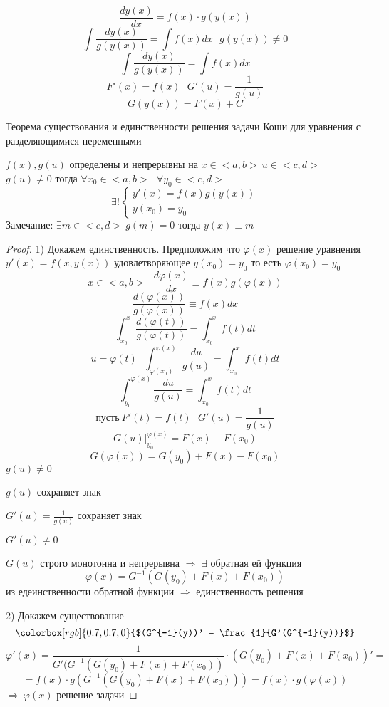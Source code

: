 \begin{block}
  $$
  \frac{dy(x)}{dx} = f(x) \cdot g(y(x))
  $$
  $$
  \int \frac{dy(x)}{g(y(x))} = \int f(x)dx ~~~ g(y(x)) \not= 0
  $$
  $$
  \int \frac{dy(x)}{g(y(x))} = \int f(x)dx
  $$
  $$
  F'(x) = f(x) ~~~ G'(u) = \frac{1}{g(u)}
  $$
  $$
  G(y(x)) = F(x) + C
  $$
\end{block}

\begin{title}[\Large]
  Теорема существования и единственности решения задачи Коши для уравнения с
  разделяющимися переменными
\end{title}

\begin{theorem}
  $f(x), g(u)$ определены и непрерывны на $x \in <a, b> ~ u \in <c, d>$
  $g(u) \not= 0$ тогда
  $\forall x_0 \in <a, b> ~~~ \forall y_0 \in <c, d>$
  $$
  \exists!
  \left\{
  \begin{array}{l}
    y'(x) = f(x) g(y(x)) \\
    y(x_0) = y_0
  \end{array}
  \right.
  $$
  Замечание: $\exists m \in <c, d> ~ g(m) = 0$ тогда $y(x) \equiv m$
\end{theorem}

\begin{proof}
  1) Докажем единственность. Предположим что $\varphi(x)$ решение уравнения
  $y'(x) = f(x, y(x))$ удовлетворяющее $y(x_0) = y_0$ то есть
  $\varphi(x_0) = y_0$
  $$
  x \in <a, b> ~~~ \frac{d\varphi(x)}{dx} \equiv f(x)g(\varphi(x))
  $$
  $$
  \frac{d(\varphi(x))}{g(\varphi(x))} \equiv f(x)dx
  $$
  $$
  \int_{x_0}^x \frac{d(\varphi(t))}{g(\varphi(t))} = \int_{x_0}^x f(t)dt
  $$
  $$
  u = \varphi(t) ~~~ \int_{\varphi(x_0)}^{\varphi(x)} \frac{du}{g(u)} =
  \int_{x_0}^x f(t)dt
  $$
  $$
  \int_{y_0}^{\varphi(x)} \frac{du}{g(u)} = \int_{x_0}^x f(t)dt
  $$
  $$
  \text{пусть} ~ F'(t) = f(t) ~~~ G'(u) = \frac{1}{g(u)}
  $$
  $$
  G(u) |_{y_0}^{\varphi(x)} = F(x) - F(x_0)
  $$
  $$
  G(\varphi(x)) = G(y_0) + F(x) - F(x_0)
  $$
  $g(u) \not= 0$

  $g(u)$ сохраняет знак

  $G'(u) = \frac{1}{g(u)}$ сохраняет знак

  $G'(u) \not= 0$

  $G(u)$ строго монотонна и непрерывна $\Rightarrow$
  $\exists$ обратная ей функция
  $$
  \varphi(x) = G^{-1} ( G(y_0) + F(x) + F(x_0))
  $$
  из едеинственности обратной функции $\Rightarrow$ единственность решения

  2) Докажем существование
  $$
  \colorbox[rgb]{0.7,0.7,0}{$(G^{-1}(y))' = \frac{1}{G'(G^{-1}(y))}$}
  $$
  $$
  \varphi'(x) = \frac{1}{G'( G^{-1} (G(y_0) + F(x) + F(x_0))} \cdot
  (G(y_0) + F(x) + F(x_0))' =
  $$
  $$
  = f(x) \cdot g \left( G^{-1} (G(y_0) + F(x) + F(x_0))
  \right) = f(x) \cdot g(\varphi(x))
  $$
  $\Rightarrow ~ \varphi(x)$ решение задачи
\end{proof}

